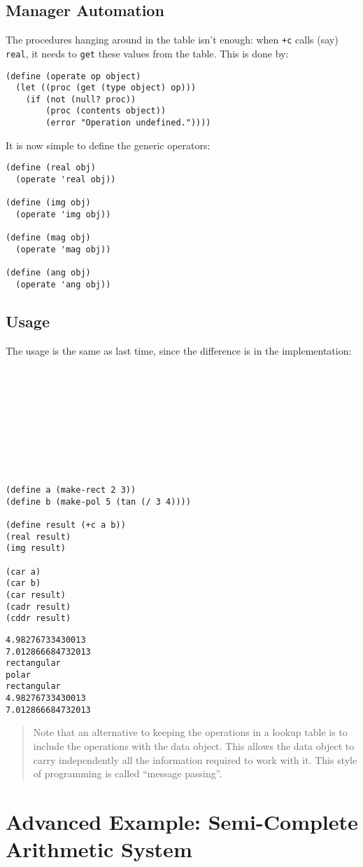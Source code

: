 \documentclass[9pt]{report}
\begin{document}
\subsection{Manager Automation}
\label{sec:orgcddb35b}

The procedures hanging around in the table isn't enough: when \texttt{+c}
calls (say) \texttt{real}, it needs to \texttt{get} these values from the table.
This is done by:

\begin{verbatim}
(define (operate op object)
  (let ((proc (get (type object) op)))
    (if (not (null? proc))
        (proc (contents object))
        (error "Operation undefined."))))
\end{verbatim}

It is now simple to define the generic operators:

\begin{verbatim}
(define (real obj)
  (operate 'real obj))

(define (img obj)
  (operate 'img obj))

(define (mag obj)
  (operate 'mag obj))

(define (ang obj)
  (operate 'ang obj))
\end{verbatim}


\subsection{Usage}
\label{sec:orgff99c38}

The usage is the same as last time, since the difference is in the
implementation:

\begin{verbatim}










(define a (make-rect 2 3))
(define b (make-pol 5 (tan (/ 3 4))))

(define result (+c a b))
(real result)
(img result)

(car a)
(car b)
(car result)
(cadr result)
(cddr result)

\end{verbatim}

\begin{verbatim}
4.98276733430013
7.012866684732013
rectangular
polar
rectangular
4.98276733430013
7.012866684732013
\end{verbatim}


\begin{quote}
Note that an alternative to keeping the operations in a lookup
table is to include the operations with the data object. This
allows the data object to carry independently all the information
required to work with it. This style of programming is called
``message passing''.
\end{quote}

\section{Advanced Example: Semi-Complete Arithmetic System}
\label{sec:org5d5528e}
\end{document}
